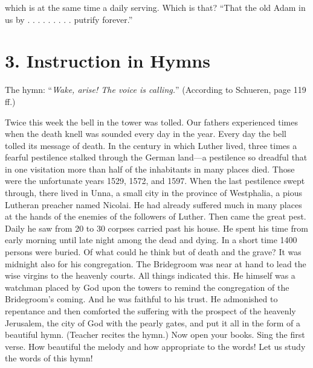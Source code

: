 which is at the same time a daily serving. Which is that? “That the old Adam in us by . . . . . . . . . putrify forever.”

\section{3. Instruction in Hymns}

The hymn: “\emph{Wake, arise! The voice is calling.}” (According to Schueren, page 119 ff.)

Twice this week the bell in the tower was tolled. Our fathers experienced times when the death knell was sounded every day in the year. Every day the bell tolled its message of death. In the century in which Luther lived, three times a fearful pestilence stalked through the German land—a pestilence so dreadful that in one visitation more than half of the inhabitants in many places died. Those were the unfortunate years 1529, 1572, and 1597. When the last pestilence swept through, there lived in Unna, a small city in the province of Westphalia, a pious Lutheran preacher named Nicolai. He had already suffered much in many places at the hands of the enemies of the followers of Luther. Then came the great pest. Daily he saw from 20 to 30 corpses carried past his house. He spent his time from early morning until late night among the dead and dying. In a short time 1400 persons were buried. Of what could he think but of death and the grave? It was midnight also for his congregation. The Bridegroom was near at hand to lead the wise virgins to the heavenly courts. All things indicated this. He himself was a watchman placed by God upon the towers to remind the congregation of the Bridegroom’s coming. And he was faithful to his trust. He admonished to repentance and then comforted the suffering with the prospect of the heavenly Jerusalem, the city of God with the pearly gates, and put it all in the form of a beautiful hymn. (Teacher recites the hymn.) Now open your books. Sing the first verse. How beautiful the melody and how appropriate to the words! Let us study the words of this hymn!

